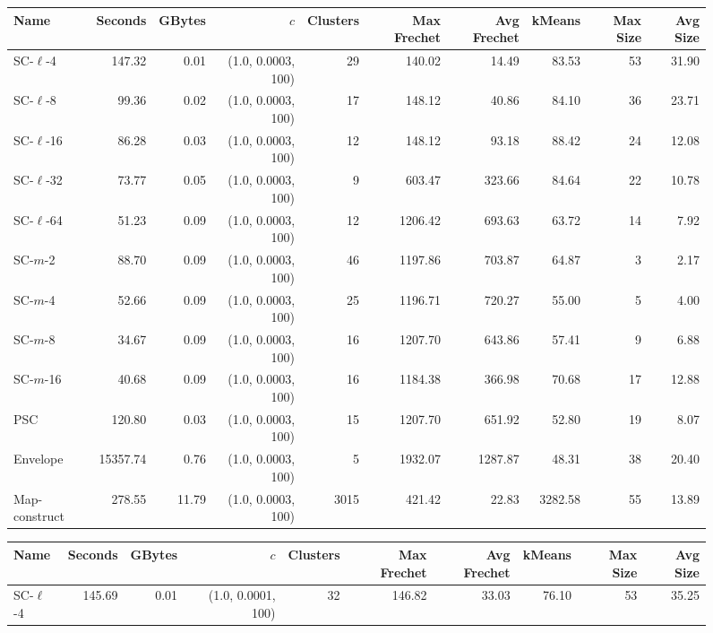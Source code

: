 \documentclass[11pt]{article}
\begin{document}
    \begin{figure} \begin{center}
    \begin{minipage}{\textwidth}
    {
    \begin{tabular}{@{}lrrrrrrrrr@{}}
        \toprule
        Name & Seconds & GBytes & $c$ & Clusters & Max Frechet & Avg Frechet & kMeans & Max Size & Avg Size\\
        \midrule
        SC-$\ell$-4 & 147.32 & 0.01 & (1.0, 0.0003, 100) & 29 & 140.02 & 14.49 & 83.53 & 53 & 31.90\\
SC-$\ell$-8 & 99.36 & 0.02 & (1.0, 0.0003, 100) & 17 & 148.12 & 40.86 & 84.10 & 36 & 23.71\\
SC-$\ell$-16 & 86.28 & 0.03 & (1.0, 0.0003, 100) & 12 & 148.12 & 93.18 & 88.42 & 24 & 12.08\\
SC-$\ell$-32 & 73.77 & 0.05 & (1.0, 0.0003, 100) & 9 & 603.47 & 323.66 & 84.64 & 22 & 10.78\\
SC-$\ell$-64 & 51.23 & 0.09 & (1.0, 0.0003, 100) & 12 & 1206.42 & 693.63 & 63.72 & 14 & 7.92\\
SC-$m$-2 & 88.70 & 0.09 & (1.0, 0.0003, 100) & 46 & 1197.86 & 703.87 & 64.87 & 3 & 2.17\\
SC-$m$-4 & 52.66 & 0.09 & (1.0, 0.0003, 100) & 25 & 1196.71 & 720.27 & 55.00 & 5 & 4.00\\
SC-$m$-8 & 34.67 & 0.09 & (1.0, 0.0003, 100) & 16 & 1207.70 & 643.86 & 57.41 & 9 & 6.88\\
SC-$m$-16 & 40.68 & 0.09 & (1.0, 0.0003, 100) & 16 & 1184.38 & 366.98 & 70.68 & 17 & 12.88\\
PSC& 120.80 & 0.03 & (1.0, 0.0003, 100) & 15 & 1207.70 & 651.92 & 52.80 & 19 & 8.07\\
Envelope & 15357.74 & 0.76 & (1.0, 0.0003, 100) & 5 & 1932.07 & 1287.87 & 48.31 & 38 & 20.40\\
Map-construct & 278.55 & 11.79 & (1.0, 0.0003, 100) & 3015 & 421.42 & 22.83 & 3282.58 & 55 & 13.89\\
        \bottomrule
    \end{tabular}
    }
    {
    \begin{tabular}{@{}lrrrrrrrrr@{}}
        \toprule
        Name & Seconds & GBytes & $c$ & Clusters & Max Frechet & Avg Frechet & kMeans & Max Size & Avg Size\\
        \midrule
        SC-$\ell$-4 & 145.69 & 0.01 & (1.0, 0.0001, 100) & 32 & 146.82 & 33.03 & 76.10 & 53 & 35.25\\

\end{tabular}}
\end{minipage}
\end{center}
\end{figure}
\end{document}
